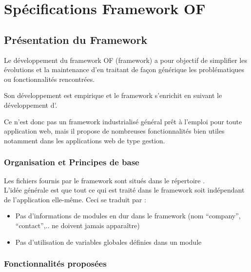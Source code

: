 
\section{Spécifications Framework OF}

\subsection{Présentation du Framework}

Le développement du framework OF (\obm framework) a pour objectif de simplifier les évolutions et la maintenance d'\obm en traitant de façon générique les problématiques ou fonctionnalités rencontrées.

Son développement est empirique et le framework s'enrichit en suivant le développement d'\obm.

Ce n'est donc pas un framework industrialisé général prêt à l'emploi pour toute application web, mais il propose de nombreuses fonctionnalités bien utiles notamment dans les applications web de type gestion.


\subsubsection{Organisation et Principes de base}

Les fichiers fournis par le framework sont situés dans le répertoire .\\

L'idée générale est que tout ce qui est traité dans le framework soit indépendant de l'application elle-même. Ceci se traduit par :\\
\begin{itemize}
\item Pas d'informations de modules en dur dans le framework (nom ``company'', ``contact'',.. ne doivent jamais apparaître)
\item Pas d'utilisation de variables globales définies dans un module
\end{itemize}


\subsubsection{Fonctionnalités proposées}

